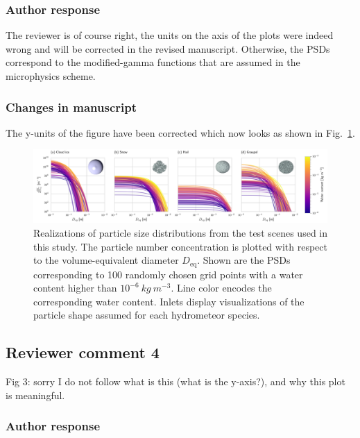 \subsubsection*{Author response}

The reviewer is of course right, the units on the axis of the plots were indeed
wrong and will be corrected in the revised manuscript. Otherwise, the PSDs
correspond to the modified-gamma functions that are assumed in the
\cite{milbrandtyau05} microphysics scheme.

\subsubsection*{Changes in manuscript}

The y-units of the figure have been corrected which now looks as shown
in Fig.~\ref{fig:gem_psds}.

\begin{figure}[h!]
\centering \includegraphics[width = \textwidth]{../plots/gem_psds.png}
\caption{Realizations of particle size distributions from the test scenes used
  in this study. The particle number concentration is plotted with respect to
  the volume-equivalent diameter $D_\text{eq}$. Shown are the PSDs corresponding
  to 100 randomly chosen grid points with a water content higher than
  $10^{-6}\ \unit{kg\ m^{-3}}$. Line color encodes the corresponding water
  content. Inlets display visualizations of the particle shape assumed for each
  hydrometeor species.}
\label{fig:gem_psds}
\end{figure}

\subsection*{Reviewer comment 4}

Fig 3: sorry I do not follow what is this (what is the y-axis?), and why this plot is meaningful.

\subsubsection*{Author response}

